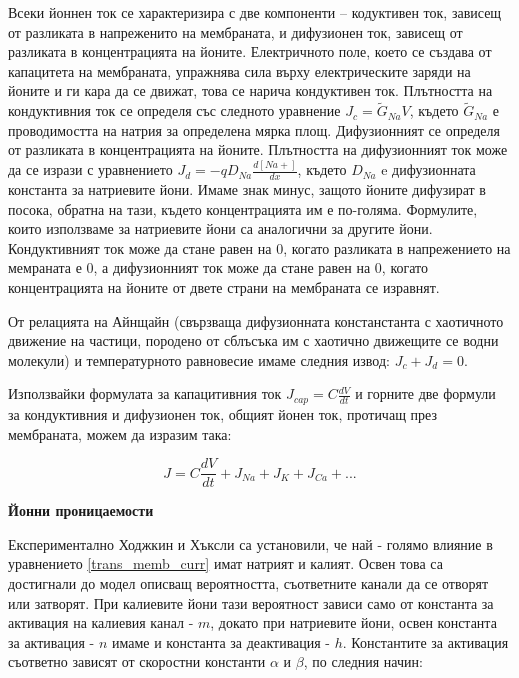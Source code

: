 \documentclass{article}
\numberwithin{equation}{section}
\begin{document}
Всеки йоннен ток се характеризира с две компоненти -- кодуктивен ток, зависещ от разликата в напреженито на мембраната, и дифузионен ток,
зависещ от разликата в концентрацията на йоните. Електричното поле, което се създава от капацитета на мембраната, упражнява сила върху
електрическите заряди на йоните и ги кара да се движат, това се нарича кондуктивен ток. Плътността на кондуктивния ток се определя със
следното уравнение $J_c=\tilde{G}_{Na}V$, където $\tilde{G}_{Na}$ е проводимостта на натрия за определена мярка площ. Дифузионният се
определя от разликата в концентрацията на йоните. Плътността на дифузионният ток може да се изрази с уравнението
$J_d=-qD_{Na}\frac{d[Na+]}{dx}$, където $D_{Na}$ e дифузионната константа за натриевите йони. Имаме знак минус, защото йоните дифузират в
посока, обратна на тази, където концентрацията им е по-голяма. Формулите, които използваме за натриевите йони са аналогични за другите йони.
Кондуктивният ток може да стане равен на 0, когато разликата в напрежението на мемраната е 0, а дифузионният ток може да стане равен на 0,
когато концентрацията на йоните от двете страни на мембраната се изравнят. 

От релацията на Айнщайн (свързваща дифузионната констанстанта с хаотичното движение на частици, породено от сблъсъка им с хаотично движещите
се водни молекули) и температурното равновесие имаме следния извод: $J_c + J_d = 0$.

Използвайки формулата за капацитивния ток $J_{cap}=C\frac{dV}{dt}$ и горните две формули за кондуктивния и дифузионен ток, общият йонен ток, протичащ през мембраната, можем да изразим така:

\begin{equation}\label{trans_memb_curr}
        J = C\frac{dV}{dt} + J_{Na} + J_{K} + J_{Ca} + ...
    \end{equation}

\vspace{5mm} %
\textbf{Йонни проницаемости}

Експериментално Ходжкин и Хъксли са установили, че най - голямо влияние в уравнението \eqref{trans_memb_curr} имат натрият и калият. Освен това
са достигнали до модел описващ вероятността, съответните канали да се отворят или затворят. При калиевите йони тази вероятност зависи само
от константа за активация на калиевия канал - $m$, докато при натриевите йони, освен константа за активация - $n$ имаме и константа за
деактивация - $h$. Константите за активация съответно зависят от скоростни константи $\alpha$ и $\beta$, по следния начин:
\end{document}
